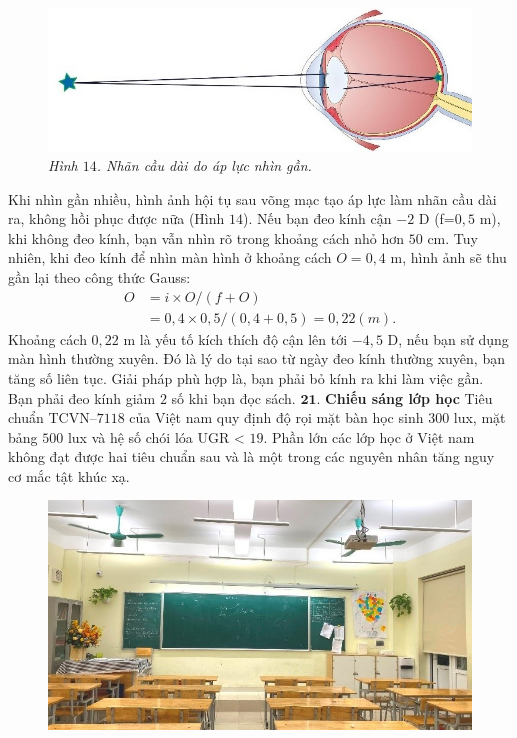 \begin{multicols}{2}
\begin{figure}[H]
		\centering
		\captionsetup{labelformat= empty, justification=centering}
		\includegraphics[width= 1\linewidth]{14}
		\caption{\small\textit{\color{timhieukhoahoc}Hình $14$. Nhãn cầu dài do áp lực nhìn gần.}}
		\vspace*{-10pt}
	\end{figure}
	Khi nhìn gần nhiều, hình ảnh hội tụ sau võng mạc tạo áp lực làm nhãn cầu dài ra, không hồi phục được nữa (Hình $14$). Nếu bạn đeo kính cận $-2$ D (f=$0{,}5$ m), khi không đeo kính, bạn vẫn nhìn rõ trong khoảng cách nhỏ hơn $50$ cm. Tuy nhiên, khi đeo kính để nhìn màn hình ở khoảng cách $O=0{,}4$ m, hình ảnh sẽ thu gần lại theo công thức Gauss: 
	\begin{align*}
		O&=i\times O/(f+O) \\
		&= 0{,}4\times 0{,}5/(0,4+0,5) = 0,22 (m).
	\end{align*}
	Khoảng cách $0{,}22$ m là yếu tố kích thích độ cận lên tới $-4{,}5$ D, nếu bạn sử dụng màn hình thường xuyên. Đó là lý do tại sao từ ngày đeo kính thường xuyên, bạn tăng số liên tục.
	\vskip 0.1cm
	Giải pháp phù hợp là, bạn phải bỏ kính ra khi làm việc gần. Bạn phải đeo kính giảm $2$ số khi bạn đọc sách. 
	\vskip 0.1cm
	$\pmb{21.}$ \textbf{\color{timhieukhoahoc}Chiếu sáng lớp học}
	\vskip 0.1cm
	Tiêu chuẩn TCVN--$7118$ của Việt nam quy định độ rọi mặt bàn học sinh $300$ lux, mặt bảng $500$ lux và hệ số chói lóa UGR < $19$. Phần lớn các lớp học ở Việt nam không đạt được hai tiêu chuẩn sau và là một trong các nguyên nhân tăng nguy cơ mắc tật khúc xạ.
	\begin{figure}[H]
		\vspace*{5pt}
		\centering
		\captionsetup{labelformat= empty, justification=centering}
		\includegraphics[width= 1\linewidth]{15}

\end{figure}
\end{multicols}

